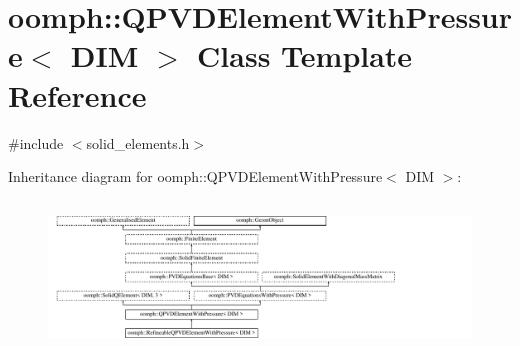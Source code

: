 \hypertarget{classoomph_1_1QPVDElementWithPressure}{}\section{oomph\+:\+:Q\+P\+V\+D\+Element\+With\+Pressure$<$ D\+IM $>$ Class Template Reference}
\label{classoomph_1_1QPVDElementWithPressure}


{\ttfamily \#include $<$solid\+\_\+elements.\+h$>$}

Inheritance diagram for oomph\+:\+:Q\+P\+V\+D\+Element\+With\+Pressure$<$ D\+IM $>$\+:\begin{figure}[H]
\begin{center}
\leavevmode
\includegraphics[height=4.020513cm]{classoomph_1_1QPVDElementWithPressure}
\end{center}
\end{figure}
